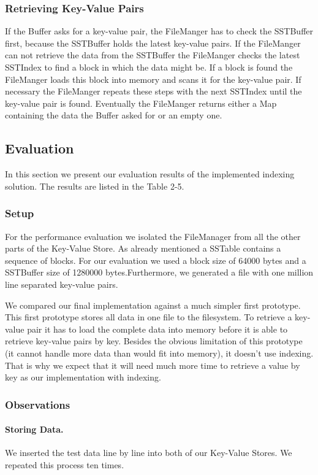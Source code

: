 \documentclass[a4paper, twocolumn,11pt]{article}
\begin{document}
\subsubsection{Retrieving Key-Value Pairs}
If the Buffer asks for a key-value pair, the FileManger has to check the SSTBuffer first, because the SSTBuffer holds the latest key-value pairs. If the FileManger can not retrieve the data from the SSTBuffer the FileManger checks the latest SSTIndex to find a block in which the data might be. If a block is found the FileManger loads this block into memory and scans it for the key-value pair. If necessary the FileManger repeats these steps with the next SSTIndex until the key-value pair is found. Eventually the FileManger returns either a Map containing the data the Buffer asked for or an empty one.  

\subsection{Evaluation}
In this section we present our evaluation results of the implemented indexing solution. The results are listed in the Table 2-5.  

\subsubsection{Setup}
For the performance evaluation we isolated the FileManager from all the other parts of the Key-Value Store. As already mentioned a SSTable contains a sequence of blocks. For our evaluation we used a block size of 64000 bytes and a SSTBuffer size of 1280000 bytes.Furthermore, we generated a file with one million line separated key-value pairs.

We compared our final implementation against a much simpler first prototype. This first prototype stores all data in one file to the filesystem. To retrieve a key-value pair it has to load the complete data into memory before it is able to retrieve key-value pairs by key. Besides the obvious limitation of this prototype (it cannot handle more data than would fit into memory), it doesn't use indexing. That is why we expect that it will need much more time to retrieve a value by key as our implementation with indexing.
  
\subsubsection{Observations}
\paragraph{Storing Data.} We inserted the test data line by line into both of our Key-Value Stores. We repeated this process ten times.   
\end{document}
